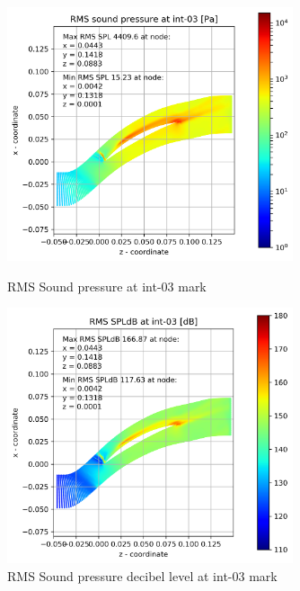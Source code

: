 \begin{figure}[ht]
  \centering
  \includegraphics[width=0.75\textwidth]{Figures/int-03-rms-spl.png}
  \caption{RMS Sound pressure at int-03 mark} \label{int-03-rms-spl}
  
  \vspace*{\floatsep}%

  \includegraphics[width=0.75\textwidth]{Figures/int-03-rms-spldb.png}
  \caption{RMS Sound pressure decibel level at int-03 mark} \label{int-03-rms-spldb}
\end{figure}

